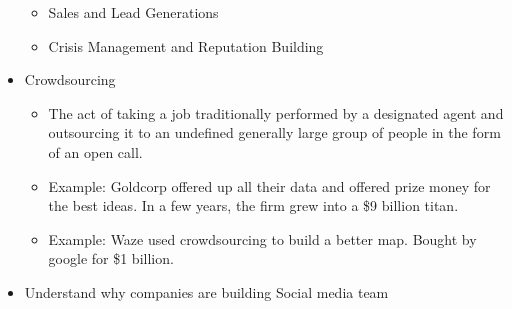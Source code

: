 \documentclass{report}
\begin{document}
\begin{itemize}
\begin{itemize}
            \item Sales and Lead Generations
            \item Crisis Management and Reputation Building
        \end{itemize}	
    \item Crowdsourcing
        \begin{itemize}[label=$\circ$]
            \item The act of taking a job traditionally performed by a designated agent and outsourcing it to an undefined generally large group of people in the form of an open call.
            \item Example: Goldcorp offered up all their data and offered prize money for the best ideas. In a few years, the firm grew into a \$9 billion titan.
            \item Example: Waze used crowdsourcing to build a better map. Bought by google for \$1 billion.
        \end{itemize}
    \item Understand why companies are building Social media team
\end{itemize}
\end{document}
